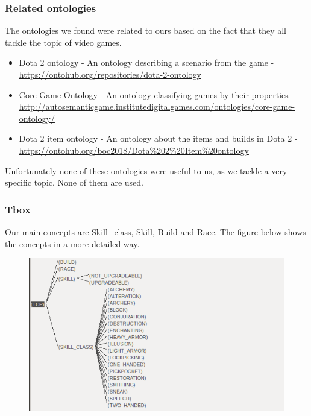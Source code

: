 \documentclass{beamer}
\begin{document}
\begin{frame}
\frametitle{Related ontologies}

The ontologies we found were related to ours based on the fact that they all tackle the topic of video games.

\begin{itemize}
\item Dota 2 ontology - An ontology describing a scenario from the game - \url{https://ontohub.org/repositories/dota-2-ontology}
\item Core Game Ontology - An ontology classifying games by their properties - \url{http://autosemanticgame.institutedigitalgames.com/ontologies/core-game-ontology/}
\item Dota 2 item ontology - An ontology about the items and builds in Dota 2 - \url{https://ontohub.org/boc2018/Dota\%202\%20Item\%20ontology}
\end{itemize}

Unfortunately none of these ontologies were useful to us, as we tackle a very specific topic. None of them are used.
\end{frame}


\begin{frame}
\frametitle{Tbox}

Our main concepts are Skill\_class, Skill, Build and Race. The figure below shows the concepts in a more detailed way.

\begin{figure}[h]
\includegraphics[scale=0.5]{taxonomy}
\end{figure}

\end{frame}
\end{document}
